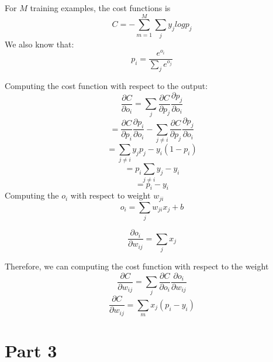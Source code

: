 \documentclass{article}
\begin{document}
\noindent For $M$ training examples, the cost functions is
\begin{equation*}
    C = - \sum_{m=1}^M \sum_{j} y_{j} log p_{j}
\end{equation*}
We also know that:
\begin{equation*}
    p_{i} = \frac {e^{o_i}} {\sum_{j} e^{o_j}}
\end{equation*}

\noindent Computing the cost function with respect to the output:
\begin{equation*}
\frac {\partial C} {\partial o_i} = \sum_{j} \frac {\partial C} {\partial p_j}  \frac {\partial p_j} {\partial o_i}
\end{equation*}
\begin{equation*}
 = \frac {\partial C} {\partial p_i}  \frac {\partial p_i}{\partial o_i} - \sum_{j \ne i} \frac {\partial C} {\partial p_j}  \frac {\partial p_j}{\partial o_i}
\end{equation*}
\begin{equation*}
 = \sum_{j \ne i} y_j p_j - y_i (1 - p_i)
\end{equation*}
\begin{equation*}
 = p_i \sum_{j \ne i} y_j - y_i
\end{equation*}
\begin{equation*}
 =  p_i - y_i 
\end{equation*}
\noindent Computing the $o_{i}$ with respect to weight $w_{ji}$
\begin{equation*}
    o_{i} = \sum_{j} w_{ji} x_{j} + b
\end{equation*}

\begin{equation*}
    \frac {\partial o_i} {\partial w_{ij}} = \sum_j x_j
\end{equation*}

\noindent Therefore, we can computing the cost function with respect to the weight
\begin{equation*}
    \frac {\partial C} {\partial w_{ij}} =\sum_j \frac {\partial C} {\partial o_i} \frac {\partial o_i} {\partial w_{ij}} 
\end{equation*}
\begin{equation*}
    \frac {\partial C} {\partial w_{ij}} = \sum_m x_j (p_i - y_i)
\end{equation*}

\vspace*{4cm}
\section*{Part 3}
\end{document}
